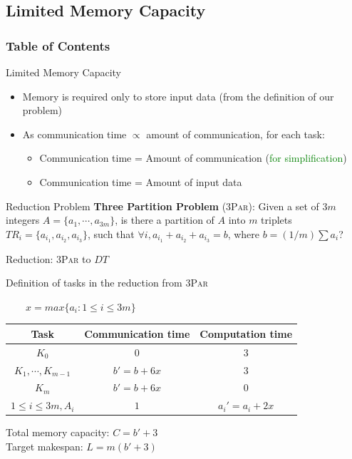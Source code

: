 \documentclass[mathserif,hyperref={pdfpagemode=FullScreen}]{beamer}
\begin{document}
\subsection{Limited Memory Capacity}
\begin{frame}
\frametitle{Table of Contents}
\tableofcontents[currentsubsection]
\end{frame}
\newcommand{\threepart}{\textsc{3Par}\xspace}
\begin{frame}{Limited Memory Capacity}
\begin{itemize}
	\item Memory is required only to store input data (from the definition of our problem)
	\item As communication time $\propto$ amount of communication, for each task:
	\begin{itemize}
		\item Communication time = Amount of communication  (\textcolor{green}{for simplification})
		\item Communication time = Amount of input data
	\end{itemize}
\end{itemize}

\begin{block}{Reduction Problem}
\textbf{Three Partition Problem} (\threepart): Given a set of
$3m$ integers $A = \{ a_1, \cdots, a_{3m }\}$, is there a partition
of $A$ into $m$ triplets $TR_i = \{a_{i_1}, a_{i_2}, a_{i_3}\}$,
such that $\forall i, a_{i_1} + a_{i_2} + a_{i_3} = b$, where
$b=(1/m) \sum a_i $?
\end{block}
\end{frame}

\begin{frame}{Reduction: \threepart to $DT$ }
\begin{block}{Definition of tasks in the reduction from \threepart}

 $\qquad x = max\{a_i:1\le i\le 3m\}$
\begin{center}
\begin{tabular}{ |c|c|c| }
	\hline
	Task & Communication time & Computation time \\ \hline
	$K_0$ & $0$ & $3$ \\ \hline
	$K_1, \cdots, K_{m-1}$ & $b'=b+6x$ & $3$\\ \hline
	$K_m$ & $b'=b+6x$ & $0$ \\ \hline
	$1\le i \le 3m, A_i$ & $1$ & $a_i' = a_i + 2x$\\ \hline
\end{tabular}
\end{center}
\begin{center}
\noindent Total memory capacity: $C=b'+3$\\
\noindent Target makespan: $L=m(b'+3)$
\end{center}
\end{block}
\end{frame}
\end{document}

